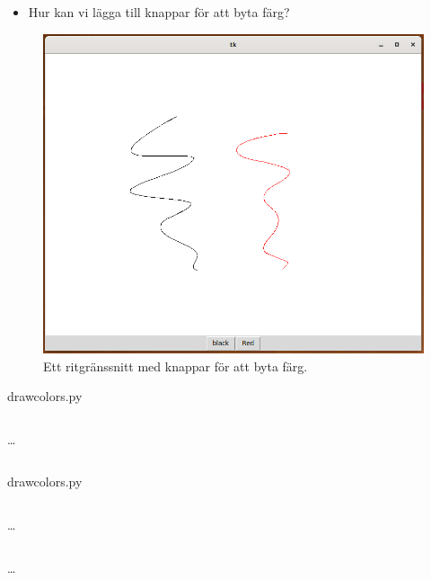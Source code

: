 \begin{frame}
  \begin{exercise}
    \begin{itemize}
      \item Hur kan vi lägga till knappar för att byta färg?
    \end{itemize}
  \end{exercise}
\end{frame}

\begin{frame}
  \begin{figure}
    \includegraphics[height=0.7\textheight]{figs/draw_colors.png}
    \caption{Ett ritgränssnitt med knappar för att byta färg.}
  \end{figure}
\end{frame}

\begin{frame}[fragile]
  draw\textunderscore colors.py \hrulefill
  \inputminted[linenos,firstline=5,lastline=7]{python}{examples/draw_colors.py}
  \dots
  \inputminted[autogobble=false,linenos,firstline=27,lastline=34]{python}{examples/draw_colors.py}
\end{frame}

\begin{frame}[fragile]
  draw\textunderscore colors.py \hrulefill
  \inputminted[autogobble=false,linenos,firstline=40,lastline=40]{python}{examples/draw_colors.py}
  \dots
  \inputminted[autogobble=false,linenos,firstline=50,lastline=54]{python}{examples/draw_colors.py}
  \dots
  \inputminted[autogobble=false,linenos,firstline=61,lastline=64]{python}{examples/draw_colors.py}
\end{frame}
